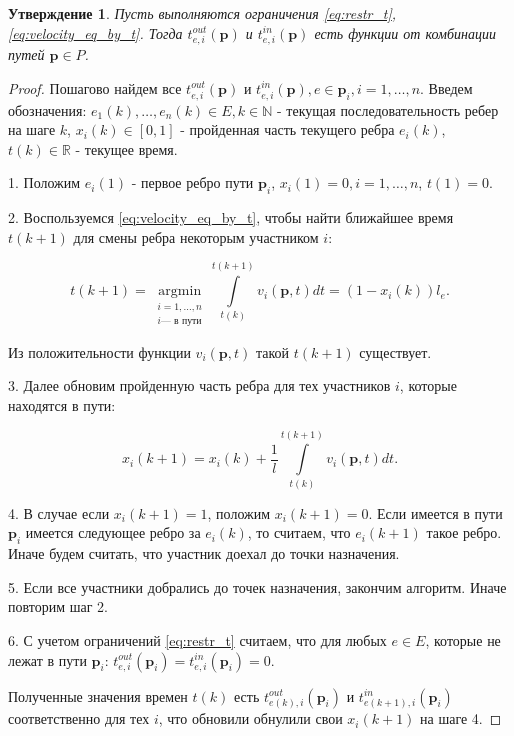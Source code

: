 \documentclass[12pt, a4paper]{article}
\DeclareMathOperator*{\argmin}{argmin}
\newtheorem{state}{Утверждение}[section]
\begin{document}
\begin{state}
\label{state:modeling}
Пусть выполняются ограничения \eqref{eq:restr_t}, \eqref{eq:velocity_eq_by_t}. Тогда $t_{e, i}^{out}(\textbf{p})$ и $t_{e, i}^{in}(\textbf{p})$ есть функции от комбинации путей $\textbf{p} \in P$.
\end{state}
\begin{proof}
Пошагово найдем все $t_{e, i}^{out}(\textbf{p})$ и $t_{e, i}^{in}(\textbf{p}), e \in \textbf{p}_i, i = 1, \dots, n$. Введем обозначения: $e_1(k), \dots, e_n(k) \in E, k \in \mathbb{N}$ - текущая последовательность ребер на шаге $k$, $x_i(k) \in [0, 1]$ - пройденная часть текущего ребра $e_i(k)$, $t(k) \in \mathbb{R}$ - текущее время.

1. Положим $e_i(1)$ - первое ребро пути $\textbf{p}_i$, $x_i(1) = 0, i = 1, \dots, n$, $t(1) = 0.$

2. Воспользуемся \eqref{eq:velocity_eq_by_t}, чтобы найти ближайшее время $t(k+1)$ для смены ребра некоторым участником $i$:

$$t(k+1) = \argmin\limits_{\substack {i = 1, \dots, n \\ i \text{--- в пути}}} \int\limits_{t(k)}^{t(k+1)} v_i(\textbf{p}, t) dt = (1 - x_i(k)) l_e .$$

Из положительности функции $v_i(\textbf{p}, t)$ такой $t(k+1)$ существует.

3. Далее обновим пройденную часть ребра для тех участников $i$, которые находятся в пути:

$$x_i(k+1) = x_i(k) + \frac{1}{l} \int\limits_{t(k)}^{t(k+1)} v_i(\textbf{p}, t) dt.$$

4. В случае если $x_i(k+1) = 1$, положим $x_i(k+1) = 0$. Если имеется в пути $\textbf{p}_i$ имеется следующее ребро за $e_i(k)$, то считаем, что $e_i(k + 1)$ такое ребро. Иначе будем считать, что участник доехал до точки назначения.

5. Если все участники добрались до точек назначения, закончим алгоритм. Иначе повторим шаг 2.

6. С учетом ограничений \eqref{eq:restr_t} считаем, что для любых $e \in E$, которые не лежат в пути $\textbf{p}_i$:  $t_{e, i}^{out} (\textbf{p}_i) = t_{e, i}^{in} (\textbf{p}_i) = 0$.

Полученные значения времен $t(k)$ есть $t_{e(k), i}^{out} (\textbf{p}_i)$ и $t_{e(k + 1), i}^{in} (\textbf{p}_i)$ соответственно для тех $i$, что обновили обнулили свои $x_i(k+1)$ на шаге 4.

\end{proof}
\end{document}
